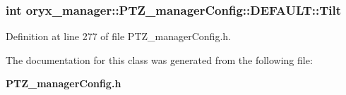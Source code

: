 \subsubsection[{\-Tilt}]{\setlength{\rightskip}{0pt plus 5cm}int {\bf oryx\-\_\-manager\-::\-P\-T\-Z\-\_\-manager\-Config\-::\-D\-E\-F\-A\-U\-L\-T\-::\-Tilt}}\label{classoryx__manager_1_1PTZ__managerConfig_1_1DEFAULT_a5cfd59d8994fdf25daf9f87c0a80898a}


\-Definition at line 277 of file \-P\-T\-Z\-\_\-manager\-Config.\-h.



\-The documentation for this class was generated from the following file\-:\begin{DoxyCompactItemize}
\item 
{\bf \-P\-T\-Z\-\_\-manager\-Config.\-h}\end{DoxyCompactItemize}
